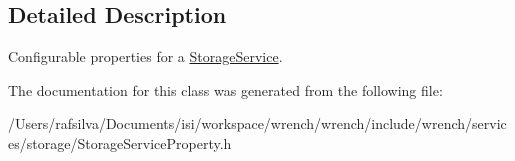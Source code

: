 \subsection{Detailed Description}
Configurable properties for a \hyperlink{classwrench_1_1_storage_service}{Storage\+Service}. 

The documentation for this class was generated from the following file\+:\begin{DoxyCompactItemize}
\item 
/\+Users/rafsilva/\+Documents/isi/workspace/wrench/wrench/include/wrench/services/storage/Storage\+Service\+Property.\+h\end{DoxyCompactItemize}
